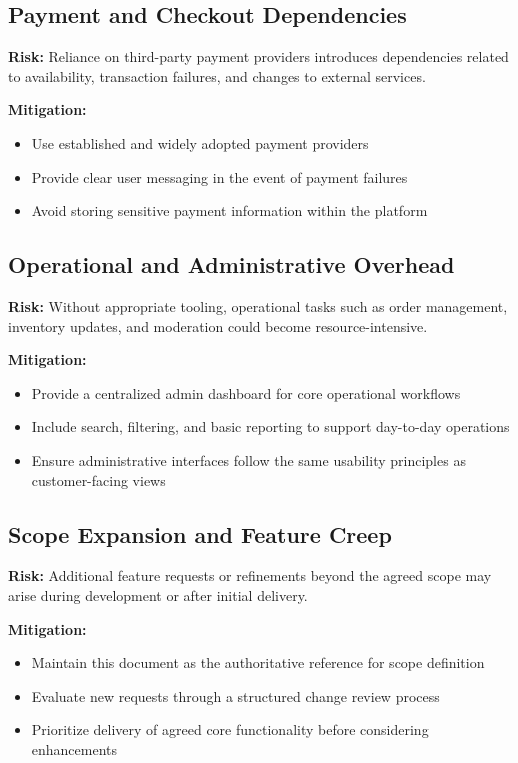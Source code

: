 \subsection{Payment and Checkout Dependencies}

\textbf{Risk:}  
Reliance on third-party payment providers introduces dependencies related to
availability, transaction failures, and changes to external services.

\textbf{Mitigation:}
\begin{itemize}[leftmargin=1.5em]
    \item Use established and widely adopted payment providers
    \item Provide clear user messaging in the event of payment failures
    \item Avoid storing sensitive payment information within the platform
\end{itemize}

\subsection{Operational and Administrative Overhead}

\textbf{Risk:}  
Without appropriate tooling, operational tasks such as order management,
inventory updates, and moderation could become resource-intensive.

\textbf{Mitigation:}
\begin{itemize}[leftmargin=1.5em]
    \item Provide a centralized admin dashboard for core operational workflows
    \item Include search, filtering, and basic reporting to support day-to-day
    operations
    \item Ensure administrative interfaces follow the same usability principles
    as customer-facing views
\end{itemize}

\subsection{Scope Expansion and Feature Creep}

\textbf{Risk:}  
Additional feature requests or refinements beyond the agreed scope may arise
during development or after initial delivery.

\textbf{Mitigation:}
\begin{itemize}[leftmargin=1.5em]
    \item Maintain this document as the authoritative reference for scope
    definition
    \item Evaluate new requests through a structured change review process
    \item Prioritize delivery of agreed core functionality before considering
    enhancements
\end{itemize}

